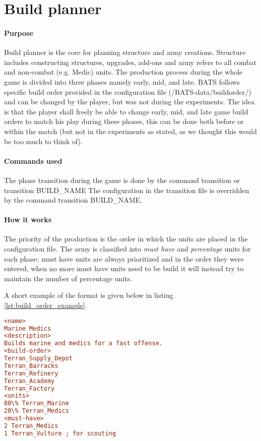 \section{Build planner}
\paragraph{Purpose}
Build planner is the core for planning structure and army creations. Structure includes constructing structures, upgrades, add-ons and army refers to all combat and non-combat (e.g. Medic) units. The production process during the whole game is divided into three phases namely early, mid, and late. BATS follows specific build order provided in the configuration file (/BATS-data/buildorder/) and can be changed by the player, but was not during the experiments. The idea is that the player shall freely be able to change early, mid, and late game build orders to match his play during these phases, this can be done both before or within the match (but not in the experiments as stated, as we thought this would be too much to think of).

\paragraph{Commands used}
The phase transition during the game is done by the command transition or transition BUILD\_NAME The configuration in the transition file is overridden by the command transition BUILD\_NAME.

\paragraph{How it works}
The priority of the production is the order in which the units are placed in the configuration file. The army is classified into \emph{must have} and \emph{percentage} units for each phase; must have units are always prioritized and in the order they were entered, when no more must have units need to be build it will instead try to maintain the number of percentage units.

A short example of the format is given below in listing \ref{lst:build_order_example}. 

\begin{lstlisting}[label={lst:build_order_example},caption={Build order example file},language=ini]
<name>
Marine Medics
<description>
Builds marine and medics for a fast offense.
<build-order>
Terran_Supply_Depot
Terran_Barracks
Terran_Refinery
Terran_Academy
Terran_Factory
<units>
80\% Terran_Marine
20\% Terran_Medics
<must-have>
2 Terran_Medics
1 Terran_Vulture ; for scouting
\end{lstlisting}

